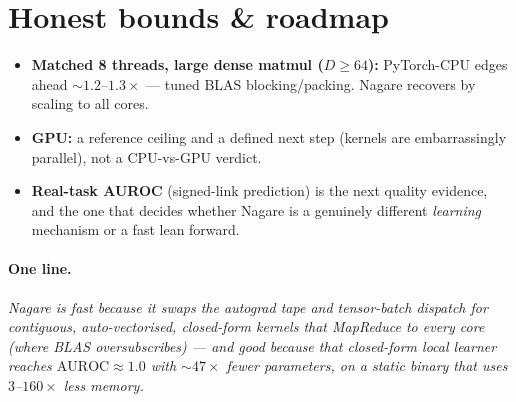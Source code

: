 \documentclass[11pt]{article}
\begin{document}
\section{Honest bounds \& roadmap}
\begin{itemize}\itemsep1pt
  \item \textbf{Matched 8 threads, large dense matmul ($D\!\ge\!64$):}
  PyTorch-CPU edges ahead $\sim1.2$--$1.3\times$ --- tuned BLAS blocking/packing.
  Nagare recovers by scaling to all cores.
  \item \textbf{GPU:} a reference ceiling and a defined next step (kernels are
  embarrassingly parallel), not a CPU-vs-GPU verdict.
  \item \textbf{Real-task AUROC} (signed-link prediction) is the next quality
  evidence, and the one that decides whether Nagare is a genuinely different
  \emph{learning} mechanism or a fast lean forward.
\end{itemize}

\paragraph{One line.}\emph{Nagare is fast because it swaps the autograd tape and
tensor-batch dispatch for contiguous, auto-vectorised, closed-form kernels that
MapReduce to every core (where BLAS oversubscribes) --- and good because that
closed-form local learner reaches $\mathrm{AUROC}\approx1.0$ with $\sim47\times$
fewer parameters, on a static binary that uses $3$--$160\times$ less memory.}
\end{document}
